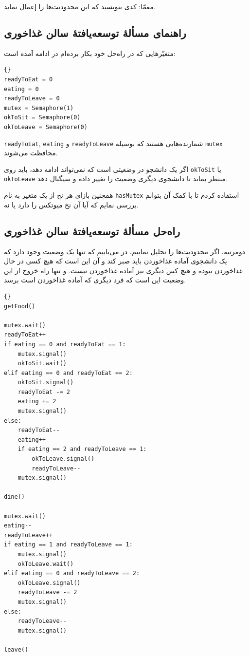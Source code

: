 \documentclass{book}
\newcommand{\clearemptydoublepage}{}%
\begin{document}
    معمّا: کدی بنویسید که این محدودیت‌ها را إعمال نماید. 


\clearemptydoublepage
\subsection{راهنمای مسألهٔ توسعه‌یافتهٔ سالن غذاخوری}

    متغیّرهایی که در راه‌حل خود بکار برده‌ام در ادامه آمده است:‌

\begin{latin}
\begin{lstlisting}[title=\rl{راهنمای مسألهٔ توسعه‌یافتهٔ سالن غذاخوری}]{}
readyToEat = 0
eating = 0
readyToLeave = 0
mutex = Semaphore(1)
okToSit = Semaphore(0)
okToLeave = Semaphore(0)
\end{lstlisting}
\end{latin}

    {\tt readyToEat}, {\tt eating} و {\tt readyToLeave} 
    شمارنده‌هایی هستند که بوسیله {\tt mutex} محافظت می‌شوند. 

    اگر یک دانشجو در وضعیتی است که نمی‌تواند ادامه دهد، باید روی {\tt okToSit} یا {\tt okToLeave} منتظر بماند تا دانشجوی دیگری 
    وضعیت را تغییر داده و سیگنال دهد. 

    همچنین بازای هر نخ از یک متغیر به نام {\tt hasMutex} استفاده کردم تا با کمک آن بتوانم بررسی نمایم که آیا آن نخ میوتکس را دارد یا نه. 

\clearemptydoublepage
\subsection{راه‌حل مسألهٔ توسعه‌یافتهٔ سالن غذاخوری}

    دومرتبه، اگر محدودیت‌ها را تحلیل نماییم، در می‌یابیم که تنها یک وضعیت وجود دارد که یک دانشجوی آماده غذاخوردن باید صبر کند و آن این است که 
    هیچ کسی در حال غذاخوردن نبوده و هیچ کس دیگری نیز آماده غذاخوردن نیست. و تنها راه خروج از این وضعیت این است که فرد دیگری که آماده غذاخوردن است 
    برسد. 

\begin{latin}
\begin{lstlisting}[title=\rl{راه‌حل مسألهٔ توسعه‌یافتهٔ سالن غذاخوری}]{}
getFood()

mutex.wait()
readyToEat++
if eating == 0 and readyToEat == 1:
    mutex.signal()
    okToSit.wait()
elif eating == 0 and readyToEat == 2:
    okToSit.signal()
    readyToEat -= 2
    eating += 2
    mutex.signal()
else:
    readyToEat--
    eating++
    if eating == 2 and readyToLeave == 1:
        okToLeave.signal()
        readyToLeave--
    mutex.signal()

dine()

mutex.wait()
eating--
readyToLeave++
if eating == 1 and readyToLeave == 1:
    mutex.signal()
    okToLeave.wait()
elif eating == 0 and readyToLeave == 2:
    okToLeave.signal()
    readyToLeave -= 2
    mutex.signal()
else:
    readyToLeave--
    mutex.signal()

leave()
\end{lstlisting}
\end{latin}
\end{document}

